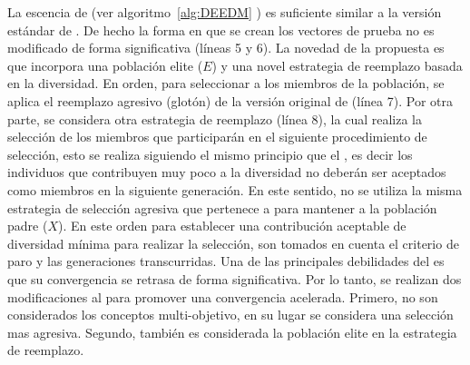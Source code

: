 La escencia de \DEEDM{} (ver algoritmo~\ref{alg:DEEDM} ) es suficiente similar a la versión estándar de \DE{}.
%
De hecho la forma en que se crean los vectores de prueba no es modificado de forma significativa (líneas 5 y 6).
%
La novedad de la propuesta es que incorpora una población elite ($E$) y una novel estrategia de reemplazo basada en la diversidad.
%
En orden, para seleccionar a los miembros de la población, se aplica el reemplazo agresivo (glotón) de la versión original de \DE (línea 7).
%
Por otra parte, se considera otra estrategia de reemplazo (línea 8), la cual realiza la selección de los miembros que participarán en el siguiente procedimiento de selección, esto se realiza siguiendo el mismo principio que el \RMDDC{}, es decir los individuos que contribuyen muy poco a la diversidad no deberán ser aceptados como miembros en la siguiente generación.
%
En este sentido, no se utiliza la misma estrategia de selección agresiva que pertenece a \DE{} para mantener a la población padre ($X$).
%
En este orden para establecer una contribución aceptable de diversidad mínima para realizar la selección, son tomados en cuenta el criterio de paro y las generaciones transcurridas.
%
Una de las principales debilidades del \RMDDC{} es que su convergencia se retrasa de forma significativa.
%
Por lo tanto, se realizan dos modificaciones al \RMDDC{} para promover una convergencia acelerada.
%
Primero, no son considerados los conceptos multi-objetivo, en su lugar se considera una selección mas agresiva.
%
Segundo, también es considerada la población elite en  la estrategia de reemplazo.

